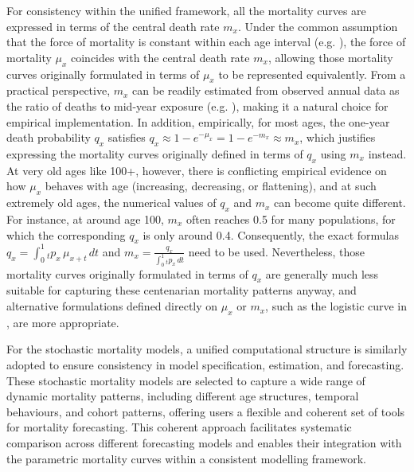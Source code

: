 For consistency within the unified framework, all the mortality curves are expressed in terms of the central death rate \(m_x\). Under the common assumption that the force of mortality is constant within each age interval (e.g. \citet{Li2013}), the force of mortality \(\mu_x\) coincides with the central death rate \(m_x\), allowing those mortality curves originally formulated in terms of \(\mu_x\) to be represented equivalently. From a practical perspective, \(m_x\) can be readily estimated from observed annual data as the ratio of deaths to mid-year exposure (e.g. \citet{HMD2026}), making it a natural choice for empirical implementation. In addition, empirically, for most ages, the one-year death probability \(q_x\) satisfies \(q_x \approx 1-e^{-\mu_x} = 1-e^{-m_x} \approx m_x\), which justifies expressing the mortality curves originally defined in terms of \(q_x\) using \(m_x\) instead. At very old ages like 100+, however, there is conflicting empirical evidence on how \(\mu_x\) behaves with age (increasing, decreasing, or flattening), and at such extremely old ages, the numerical values of \(q_x\) and \(m_x\) can become quite different. For instance, at around age 100, \(m_x\) often reaches 0.5 for many populations, for which the corresponding \(q_x\) is only around 0.4. Consequently, the exact formulas \(q_x = \int_0^1 {}_tp_x\,\mu_{x+t}\,dt\) and \(m_x=\frac{q_x}{\int_0^1 {}_tp_x\,dt}\) need to be used. Nevertheless, those mortality curves originally formulated in terms of \(q_x\) are generally much less suitable for capturing these centenarian mortality patterns anyway, and alternative formulations defined directly on \(\mu_x\) or \(m_x\), such as the logistic curve in \citet{Thatcher1999}, are more appropriate.

For the stochastic mortality models, a unified computational structure is similarly adopted to ensure consistency in model specification, estimation, and forecasting. These stochastic mortality models are selected to capture a wide range of dynamic mortality patterns, including different age structures, temporal behaviours, and cohort patterns, offering users a flexible and coherent set of tools for mortality forecasting. This coherent approach facilitates systematic comparison across different forecasting models and enables their integration with the parametric mortality curves within a consistent modelling framework.


